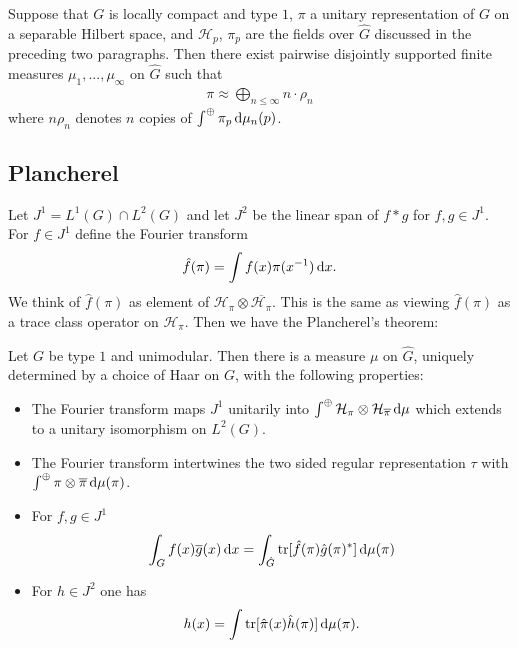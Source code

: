 \documentclass[11pt]{amsart}
\renewcommand{\H}{\mathcal{H}}
\newcommand{\tr}{\operatorname{tr}}
\begin{document}
\begin{thm}
	Suppose that $G$ is locally compact and type $1$, $\pi$ a unitary representation of $G$ on a separable Hilbert space, and $\H_{p}$, $\pi_{p}$ are the fields over $\hat{G}$ discussed in the preceding two paragraphs. Then there exist pairwise disjointly supported finite measures $\mu_{1},...,\mu_{\infty}$ on $\hat{G}$ such that 
		\begin{align*}
			\pi \approx \bigoplus_{n\leq \infty} n\cdot \rho_{n}
		\end{align*}
	where $n \rho_{n}$ denotes $n$ copies of $\int^{\oplus}\pi_{p}\,{\rm d} \mu_{n}(p)$.
\end{thm}
\subsection{Plancherel}
Let $J^{1}=L^{1}(G)\cap L^{2}(G)$ and let $J^{2}$ be the linear span of $f*g$ for $f,g\in J^{1}$. For $f\in J^{1}$ define the Fourier transform
	\begin{align*}
		\hat{f}(\pi)=\int f(x)\pi(x^{-1})\,{\rm d} x.
	\end{align*}
We think of $\hat{f}(\pi)$ as element of $\H_{\pi}\otimes \overline{\H_{\pi}}$. This is the same as viewing $\hat{f}(\pi)$ as a trace class operator on $\H_{\pi}$. Then we have the Plancherel's theorem:
	\begin{thm}
		Let $G$ be type $1$ and unimodular. Then there is a measure $\mu$ on $\hat{G}$, uniquely determined by a choice of Haar on $G$, with the following properties:
		\begin{itemize}
			\item The Fourier transform maps $J^{1}$ unitarily into $\int^{\oplus}\H_{\pi}\otimes \H_{\overline{\pi}}\dop \mu$ which extends to a unitary isomorphism on $L^{2}(G)$.
			\item The Fourier transform intertwines the two sided regular representation $\tau$ with $\int^{\oplus}\pi \otimes \overline{\pi} \,{\rm d} \mu(\pi)$. 
			\item For $f,g\in J^{1}$ 
				\begin{align*}
					\int_{G}f(x)\overline{g}(x)\,{\rm d} x=\int_{\hat{G}}\operatorname{tr}[\hat{f}(\pi) \hat{g}(\pi)^{*}] \,{\rm d} \mu (\pi)
				\end{align*} 
			\item For $h\in J^{2}$ one has 
				\begin{align*}
					h(x)=\int \tr[\hat{\pi}(x)\hat{h}(\pi)] \dop \mu(\pi).
				\end{align*}
		\end{itemize}
	\end{thm}
\end{document}
